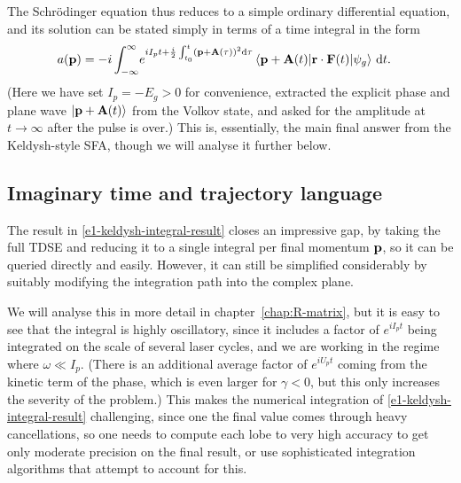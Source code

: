 The Schrödinger equation thus reduces to a simple ordinary differential equation, and its solution can be stated simply in terms of a time integral in the form
\begin{align}
a(\vbp)
& =
-i
\int_{-\infty}^{\infty} \!
e^{iI_p t+\frac i2 \int_{\tn}^{t} \left(\vbp+\vba(\tau)\right)^2 \d\tau}\matrixel{\vbp+\vba(t)}{\vbr\cdot\vbf(t)}{\psi_g}
\, \mathrm dt
.
\label{e1-keldysh-integral-result}
\end{align}
(Here we have set $I_p=-E_g>0$ for convenience, extracted the explicit phase and plane wave $\ket{\vb{p}+\vb{A}(t)}$ from the Volkov state, and asked for the amplitude at $t\to\infty$ after the pulse is over.)  This is, essentially, the main final answer from the Keldysh-style SFA, though we will analyse it further below. 




\subsection{Imaginary time and trajectory language}
The result in \eqref{e1-keldysh-integral-result} closes an impressive gap, by taking the full TDSE and reducing it to a single integral per final momentum $\vb{p}$, so it can be queried directly and easily. However, it can still be simplified considerably by suitably modifying the integration path into the complex plane. 

We will analyse  this in more detail in chapter~\ref{chap:R-matrix}, but it is easy to see that the integral is highly oscillatory, since it includes a factor of $e^{iI_pt}$ being integrated on the scale of several laser cycles, and we are working in the regime where $\omega \ll I_p$. (There is an additional average factor of $e^{iU_pt}$ coming from the kinetic term of the phase, which is even larger for $\gamma<0$, but this only increases the severity of the problem.) This makes the numerical integration of \eqref{e1-keldysh-integral-result} challenging, since one the final value comes through heavy cancellations, so one needs to compute each lobe to very high accuracy to get only moderate precision on the final result, or use sophisticated integration algorithms that attempt to account for this.


